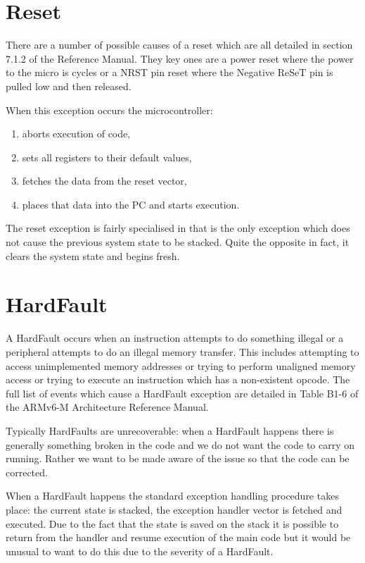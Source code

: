 \section{Reset}
There are a number of possible causes of a reset which are all detailed in section 7.1.2 of the Reference Manual. They key ones are a power reset where the power to the micro is cycles or a NRST pin reset where the Negative ReSeT pin is pulled low and then released. 

When this exception occurs the microcontroller:
\begin{enumerate}
    \item aborts execution of code, 
    \item sets all registers to their default values,
    \item fetches the data from the reset vector,
    \item places that data into the PC and starts execution. 
\end{enumerate}

The reset exception is fairly specialised in that is the only exception which does not cause the previous system state to be stacked. Quite the opposite in fact, it clears the system state and begins fresh. 

\section{HardFault}
A HardFault occurs when an instruction attempts to do something illegal or a peripheral attempts to do an illegal memory transfer. This includes attempting to access unimplemented memory addresses or trying to perform unaligned memory access or trying to execute an instruction which has a non-existent opcode. The full list of events which cause a HardFault exception are detailed in Table B1-6 of the ARMv6-M Architecture Reference Manual.

Typically HardFaults are unrecoverable: when a HardFault happens there is generally something broken in the code and we do not want the code to carry on running. Rather we want to be made aware of the issue so that the code can be corrected. 

When a HardFault happens the standard exception handling procedure takes place: the current state is stacked, the exception handler vector is fetched and executed. Due to the fact that the state is saved on the stack it is possible to return from the handler and resume execution of the main code but it would be unusual to want to do this due to the severity of a HardFault.


